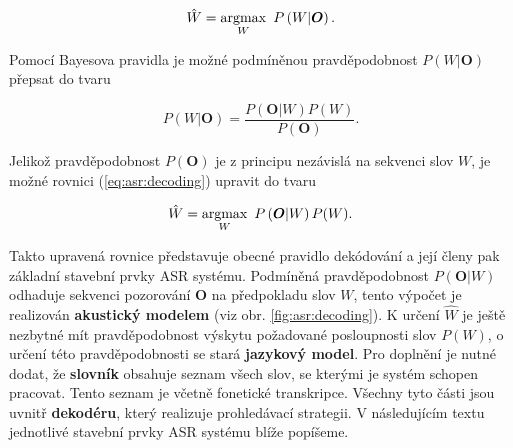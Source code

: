 \begin{equation}
  \hat{W} = \operatorname*{argmax}_W\ P\left(W | \boldsymbol{O}\right).
  \label{eq:asr:decoding}
\end{equation}

Pomocí Bayesova pravidla je možné podmíněnou pravděpodobnost $P\left(W | \boldsymbol{O}\right)$ přepsat do tvaru

\begin{equation}
  P\left(W | \boldsymbol{O}\right) = \frac{P(\boldsymbol{O}|W)P(W)}{P(\boldsymbol{O})}.
\end{equation}

Jelikož pravděpodobnost $P(\boldsymbol{O})$ je z principu nezávislá na sekvenci slov $W$, je možné rovnici (\ref{eq:asr:decoding}) upravit do tvaru

\begin{equation}
  \hat{W} = \argmax_W\ P\left(\boldsymbol{O} | W\right)P(W).
  \label{eq:asr:decoding:generic}
\end{equation}

Takto upravená rovnice představuje obecné pravidlo dekódování a její členy pak základní stavební prvky ASR systému. Podmíněná pravděpodobnost $P(\boldsymbol{O} | W)$ odhaduje sekvenci pozorování $\boldsymbol{O}$ na předpokladu slov $W$, tento výpočet je realizován \textbf{akustický modelem} (viz obr. \ref{fig:asr:decoding}). K určení $\hat{W}$ je ještě nezbytné mít pravděpodobnost výskytu požadované posloupnosti slov $P\left(W\right)$, o určení této pravděpodobnosti se stará \textbf{jazykový model}. Pro doplnění je nutné dodat, že \textbf{slovník} obsahuje seznam všech slov, se kterými je systém schopen pracovat. Tento seznam je včetně fonetické transkripce. Všechny tyto části jsou uvnitř \textbf{dekodéru}, který realizuje prohledávací strategii. V následujícím textu jednotlivé stavební prvky ASR systému blíže popíšeme.





% 


